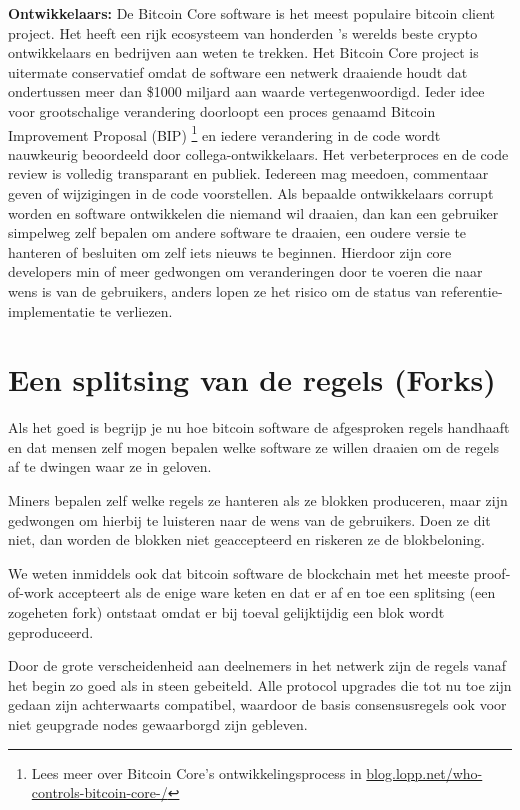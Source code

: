 \documentclass[
  letterpaper,
]{scrbook}
\begin{document}
\textbf{Ontwikkelaars:} De Bitcoin Core software is het meest populaire
bitcoin client project. Het heeft een rijk ecosysteem van honderden 's
werelds beste crypto ontwikkelaars en bedrijven aan weten te trekken.
Het Bitcoin Core project is uitermate conservatief omdat de software een
netwerk draaiende houdt dat ondertussen meer dan \$1000 miljard aan
waarde vertegenwoordigd. Ieder idee voor grootschalige verandering
doorloopt een proces genaamd Bitcoin Improvement Proposal (BIP)
\footnote{Lees meer over Bitcoin Core's ontwikkelingsprocess in
  \href{https://blog.lopp.net/who-controls-bitcoin-core-/}{blog.lopp.net/who-controls-bitcoin-core-/}}
en iedere verandering in de code wordt nauwkeurig beoordeeld door
collega-ontwikkelaars. Het verbeterproces en de code review is volledig
transparant en publiek. Iedereen mag meedoen, commentaar geven of
wijzigingen in de code voorstellen. Als bepaalde ontwikkelaars corrupt
worden en software ontwikkelen die niemand wil draaien, dan kan een
gebruiker simpelweg zelf bepalen om andere software te draaien, een
oudere versie te hanteren of besluiten om zelf iets nieuws te beginnen.
Hierdoor zijn core developers min of meer gedwongen om veranderingen
door te voeren die naar wens is van de gebruikers, anders lopen ze het
risico om de status van referentie-implementatie te verliezen.

\hypertarget{een-splitsing-van-de-regels-forks}{%
\section{Een splitsing van de regels
(Forks)}\label{een-splitsing-van-de-regels-forks}}

Als het goed is begrijp je nu hoe bitcoin software de afgesproken regels
handhaaft en dat mensen zelf mogen bepalen welke software ze willen
draaien om de regels af te dwingen waar ze in geloven.

Miners bepalen zelf welke regels ze hanteren als ze blokken produceren,
maar zijn gedwongen om hierbij te luisteren naar de wens van de
gebruikers. Doen ze dit niet, dan worden de blokken niet geaccepteerd en
riskeren ze de blokbeloning.

We weten inmiddels ook dat bitcoin software de blockchain met het meeste
proof-of-work accepteert als de enige ware keten en dat er af en toe een
splitsing (een zogeheten fork) ontstaat omdat er bij toeval gelijktijdig
een blok wordt geproduceerd.

Door de grote verscheidenheid aan deelnemers in het netwerk zijn de
regels vanaf het begin zo goed als in steen gebeiteld. Alle protocol
upgrades die tot nu toe zijn gedaan zijn achterwaarts compatibel,
waardoor de basis consensusregels ook voor niet geupgrade nodes
gewaarborgd zijn gebleven.
\end{document}
